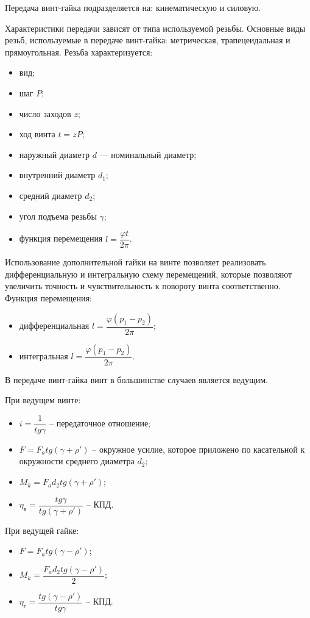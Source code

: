 \documentclass{tufte-book}
\begin{document}
Передача винт-гайка подразделяется на: кинематическую и силовую.

Характеристики передачи зависят от типа используемой резьбы. Основные виды резьб, используемые в передаче винт-гайка: метрическая, трапецеидальная и прямоугольная.
Резьба характеризуется:
\begin{itemize}
	\item вид;
	\item шаг $ P $;
	\item число заходов $ z $;
	\item ход винта $ t = z P $;
	\item наружный диаметр $ d $ --- номинальный диаметр;
	\item внутренний диаметр $ d_1 $;
	\item средний диаметр $ d_2 $;
	\item угол подъема резьбы $ \gamma $;
	\item функция перемещения $ l = \dfrac{\varphi t}{2\pi} $.
\end{itemize}

Использование дополнительной гайки на винте позволяет реализовать дифференциальную и интегральную схему перемещений, которые позволяют увеличить точность и чувствительность к повороту винта соответственно.
Функция перемещения:
\begin{itemize}
	\item дифференциальная $ l=\dfrac{\varphi (p_1 - p_2)}{2\pi} $;
	\item интегральная $ l=\dfrac{\varphi (p_1 - p_2)}{2\pi} $.
\end{itemize}


В передаче винт-гайка винт в большинстве случаев является ведущим.

При ведущем винте:
\begin{itemize}
	\item $ i = \dfrac{1}{tg \gamma}$ -- передаточное отношение;
	\item $ F = F_a tg(\gamma + \rho') $ -- окружное усилие, которое приложено по касательной к окружности среднего диаметра $ d_2 $;
	\item $ M_k = F_a d_2 tg(\gamma + \rho')$;
	\item $ \eta_\text{в} = \dfrac{tg \gamma}{tg(\gamma + \rho')} $ -- КПД.
\end{itemize}

При ведущей гайке:
\begin{itemize}
	\item $ F = F_a tg(\gamma - \rho') $;
	\item $ M_k = \dfrac{F_a d_2 tg(\gamma - \rho')}{2}$;
	\item $ \eta_\text{г} = \dfrac{tg(\gamma - \rho')}{tg \gamma} $ -- КПД.
\end{itemize}
\end{document}
